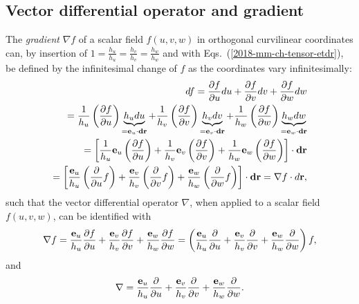 \subsection{Vector differential operator and gradient}

The {\em gradient} $\nabla f$ of a scalar field $f(u,v,w)$ in orthogonal curvilinear coordinates can,
by insertion of $1=\frac{h_u}{h_u}=\frac{h_v}{h_v}=\frac{h_w}{h_w}$ and
with Eqs.~(\ref{2018-mm-ch-tensor-etdr}), be defined by
the infinitesimal change of $f$  as the coordinates vary infinitesimally:
\begin{equation}
\begin{split}
df  =
\frac{\partial f}{\partial u} du +
\frac{\partial f}{\partial v} dv +
\frac{\partial f}{\partial w} dw
\\
=
\frac{1}{h_u} \left(\frac{\partial f}{\partial u}\right) \underbrace{h_u du}_{={\bf e}_u \cdot {\bf dr}} +
\frac{1}{h_v} \left(\frac{\partial f}{\partial v}\right) \underbrace{h_v dv}_{={\bf e}_v \cdot {\bf dr}}  +
\frac{1}{h_w} \left(\frac{\partial f}{\partial w}\right) \underbrace{h_w dw}_{={\bf e}_w \cdot {\bf dr}}
\\
=
\left[
\frac{1}{h_u}  {\bf e}_u \left(\frac{\partial f}{\partial u}\right)     +
\frac{1}{h_v}  {\bf e}_v \left(\frac{\partial f}{\partial v}\right)      +
\frac{1}{h_w}  {\bf e}_w \left(\frac{\partial f}{\partial w}\right)   \right]
\cdot {\bf dr}
\\
=
\left[
\frac{{\bf e}_u}{h_u}  \left(\frac{\partial  }{\partial u} f \right)  +
\frac{{\bf e}_v}{h_v}  \left(\frac{\partial  }{\partial v} f \right)    +
\frac{{\bf e}_w}{h_w}  \left(\frac{\partial  }{\partial w} f \right)
\right]
\cdot {\bf dr}
=\nabla f \cdot d {\bf r}
,
\end{split}
\label{2018-mm-ch-del}
\end{equation}
such that the vector differential operator $\nabla$, when applied to a scalar field $f(u,v,w)$,
can be identified with
\begin{equation}
 \nabla  f
=
\frac{{\bf e}_u}{h_u}  \frac{\partial  f}{\partial u}    +
\frac{{\bf e}_v}{h_v}  \frac{\partial  f}{\partial v}      +
\frac{{\bf e}_w}{h_w} \frac{\partial  f}{\partial w}
=
\left(
\frac{{\bf e}_u}{h_u}  \frac{\partial   }{\partial u}    +
\frac{{\bf e}_v}{h_v}  \frac{\partial   }{\partial v}      +
\frac{{\bf e}_w}{h_w} \frac{\partial   }{\partial w}
\right) f,
\end{equation}
and
\begin{equation}
 \nabla
=
\frac{{\bf e}_u}{h_u}  \frac{\partial   }{\partial u}    +
\frac{{\bf e}_v}{h_v}  \frac{\partial   }{\partial v}      +
\frac{{\bf e}_w}{h_w} \frac{\partial   }{\partial w}
.
\label{2018-mm-ch-veo}
\end{equation}
